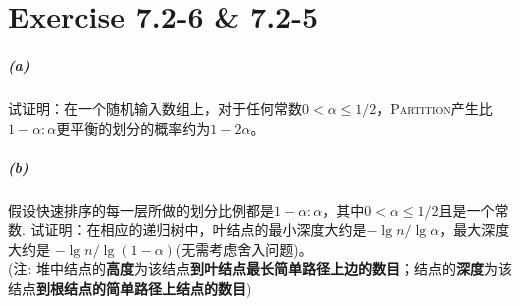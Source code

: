 \documentclass{article}
\begin{document}
\section{Exercise 7.2-6 \& 7.2-5}
\subparagraph{(a)}
试证明：在一个随机输入数组上，对于任何常数$0 < \alpha \leq 1/2$，\textsc{Partition}产生比$1−\alpha : \alpha$更平衡的划分的概率约为$1−2\alpha$。
\subparagraph{(b)}
假设快速排序的每一层所做的划分比例都是$1−\alpha : \alpha$，其中$0 < \alpha \leq 1/2$且是一个常数. 试证明：在相应的递归树中，叶结点的最小深度大约是$−\lg{n}/\lg{\alpha}$，最大深度大约是 $−\lg{n}/\lg{(1−\alpha)}$(无需考虑舍入问题)。\\
(注: 堆中结点的\textbf{高度}为该结点\textbf{到叶结点最长简单路径上边的数目}；结点的\textbf{深度}为该结点\textbf{到根结点的简单路径上结点的数目})
\\
\end{document}
